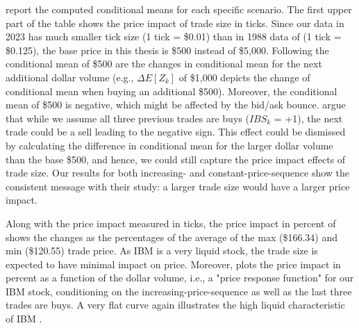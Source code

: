  report the computed conditional means for each specific scenario. The first upper part of the table shows the price impact of trade size in ticks. Since our data in 2023 has much smaller tick size (1 tick = \$0.01) than in 1988 data of \citet{hausman1992} (1 tick = \$0.125), the base price in this thesis is \$500 instead of \$5,000. Following the conditional mean of \$500 are the changes in conditional mean for the next additional dollar volume (e.g., \(\Delta E[Z_k]\) of \$1,000 depicts the change of conditional mean when buying an additional \$500). Moreover, the conditional mean of \$500 is negative, which might be affected by the bid/ask bounce. \citet{hausman1992} argue that while we assume all three previous trades are buys ($IBS_k$ = +1), the next trade could be a sell leading to the negative sign. This effect could be dismissed by calculating the difference in conditional mean for the larger dollar volume than the base \$500, and hence, we could still capture the price impact effects of trade size. Our results for both increasing- and constant-price-sequence show the consistent message with their study: a larger trade size would have a larger price impact.

Along with the price impact measured in ticks, the price impact in percent of  shows the changes as the percentages of the average of the max (\$166.34) and min (\$120.55) trade price. As IBM is a very liquid stock, the trade size is expected to have minimal impact on price. Moreover,  plots the price impact in percent as a function of the dollar volume, i.e., a "price response function" for our IBM stock, conditioning on the increasing-price-sequence as well as the last three trades are buys. A very flat curve again illustrates the high liquid characteristic of IBM \citep{hausman1992}.







